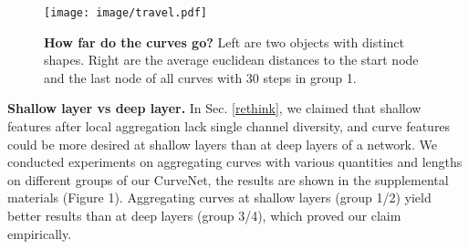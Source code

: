 \documentclass[10pt,twocolumn,letterpaper]{article}
\theoremstyle{definition}
\begin{document}
\begin{table}[t]
	\begin{center}
	\caption{Component study results. Top-1 classification accuracy and per point cloud (per batch) inference time are reported. LPFA: the Local Point-Feature Aggregation, CG: the Curve Grouping operator, DM: the Dynamic Momentum strategy, CS: the Crossover Suppression strategy, and CA: the Curve Aggregation operator.}
	    
		
		\label{comp}
	\end{center}
\end{table} 
\begin{figure}[t]
	\begin{center}
\texttt{[image: image/travel.pdf]}
	\end{center}
	\caption{\textbf{How far do the curves go?} Left are two objects with distinct shapes. Right are the average euclidean distances to the start node and the last node of all curves with 30 steps in group 1.}
	\label{fig:travel}
\end{figure}



\noindent
\textbf{Shallow layer vs deep layer.} In Sec. \ref{rethink}, we claimed that shallow features after local aggregation lack single channel diversity, and curve features could be more desired at shallow layers than at deep layers of a network. We conducted experiments on aggregating curves with various quantities and lengths on different groups of our CurveNet, the results are shown in the supplemental materials (Figure 1). Aggregating curves at shallow layers (group 1/2) yield better results than at deep layers (group 3/4), which proved our claim empirically. 
\end{document}
